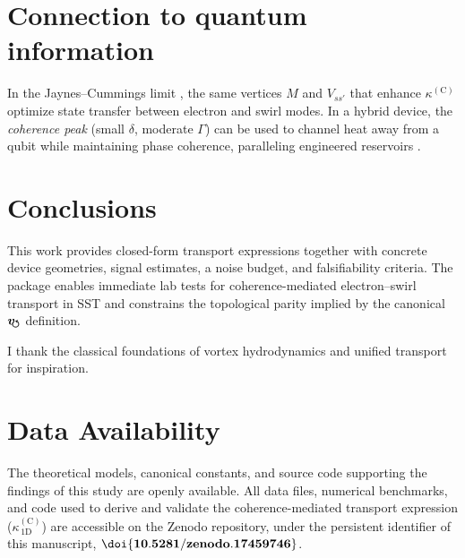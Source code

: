 \documentclass[aps,prb,preprint,amsmath,amssymb]{revtex4-2} %
\newcommand{\vswirl}{v_{\!\mkern-2mu\scriptstyle\boldsymbol{\circlearrowleft}}}
\begin{document}
    \section{Connection to quantum information}
        In the Jaynes--Cummings limit \cite{Jaynes1963}, the same vertices $M$ and $V_{ss'}$ that enhance $\kappa^{(\mathrm C)}$ optimize state transfer between electron and swirl modes. In a hybrid device, the \emph{coherence peak} (small $\delta$, moderate $\Gamma$) can be used to channel heat away from a qubit while maintaining phase coherence, paralleling engineered reservoirs \cite{Breuer2002,Aspelmeyer2014}.

    \section{Conclusions}
        This work provides closed-form transport expressions together with concrete device geometries, signal estimates, a noise budget, and falsifiability criteria. The package enables immediate lab tests for coherence-mediated electron--swirl transport in SST and constrains the topological parity implied by the canonical $\boldsymbol{\vswirl}$ definition.

        \begin{acknowledgments}
            I thank the classical foundations of vortex hydrodynamics and unified transport \cite{Madelung1927,Peierls1929,AllenFeldman1993,Simoncelli2019Unified} for inspiration.
        \end{acknowledgments}

    \section*{Data Availability}

        The theoretical models, canonical constants, and source code supporting the findings of this study are openly available. All data files, numerical benchmarks, and code used to derive and validate the coherence-mediated transport expression ($\kappa^{(\mathrm C)}_{\!\,1\mathrm D}$) are accessible on the Zenodo repository, under the persistent identifier of this manuscript, $\mathbf{\doi{\paperdoi}}$.
\end{document}
